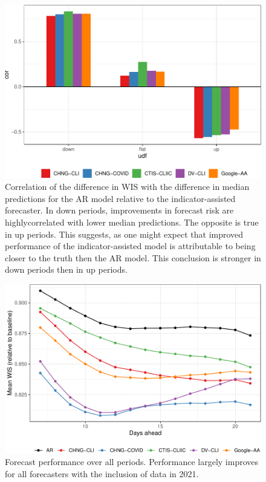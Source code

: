 \documentclass[9pt,twoside,lineno]{pnas-new}
\begin{document}
\clearpage

\clearpage

\begin{figure}

{\centering \includegraphics[width=\textwidth]{fig/upswing-corr-table-1} 

}

\caption{Correlation of the difference in WIS with the difference in median predictions for the AR model relative to the indicator-assisted forecaster. In down periods, improvements in forecast risk are highlycorrelated with lower median predictions. The opposite is true in up periods. This suggests, as one might expect that improved performance of the indicator-assisted model is attributable to being closer to the truth then the AR model. This conclusion is stronger in down periods then in up periods.}\label{fig:upswing-corr-table}
\end{figure}

\clearpage

\begin{figure}

{\centering \includegraphics[width=\textwidth]{fig/fcast-alldates-1} 

}

\caption{Forecast performance over all periods. Performance largely improves for all forecasters with the inclusion of data in 2021.}\label{fig:fcast-alldates}
\end{figure}
\end{document}
